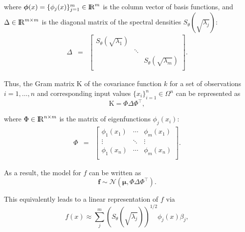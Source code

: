 \documentclass[]{interact}
\theoremstyle{plain}%
\theoremstyle{definition}
\theoremstyle{remark}
\begin{document}
\noindent where $\boldsymbol{\phi}(x)=\{\phi_j(x)\}_{j=1}^{m} \in {\rm I\!R}^{m}$ is the column vector of basis functions, and $\Delta  \in {\rm I\!R}^{m\times m}$ is the diagonal matrix of the spectral densities $S_{\theta}(\sqrt{\lambda_j})$: 
%
\begin{eqnarray}
\Delta &=&  \begin{bmatrix}
    S_{\theta}(\sqrt{\lambda_1}) & & \\
    & \ddots & \nonumber \\
    & & S_{\theta}(\sqrt{\lambda_m}) \\
  \end{bmatrix}.
\end{eqnarray}

Thus, the Gram matrix $\text{K}$ of the covariance function $k$ for a set of observations $i=1,\ldots,n$ and corresponding input values $\{x_i\}_{i=1}^{n} \in \Omega^{n}$ can be represented as
%
\begin{equation}
\text{K}= \Phi \Delta \Phi^\intercal, \nonumber
\end{equation}

\noindent where $\Phi \in {\rm I\!R}^{n\times m}$ is the matrix of eigenfunctions $\phi_j(x_i)$:
%
\begin{eqnarray}
\Phi &=&  \left[ {\begin{array}{ccc}
   \phi_1(x_1) & \cdots & \phi_m(x_1)  \\
    \vdots &\ddots & \vdots  \nonumber \\ 
    \phi_1(x_n) & \cdots & \phi_m(x_n) \\
  \end{array} } \right].
\end{eqnarray}
 
\noindent As a result, the model for $f$ can be written as
%
\begin{equation}
\mathbf{f} \sim \mathcal{N}(\boldsymbol{\mu},\Phi \Delta \Phi^\intercal). \nonumber
\end{equation}

\noindent This equivalently leads to a linear representation of $f$ via
%
\begin{equation}\label{approxf}
f(x) \approx \sum_{j}^m \left( S_{\theta}(\sqrt{\lambda_j})\right)^{1/2} \phi_j(x) \beta_j,
\end{equation}
\end{document}
